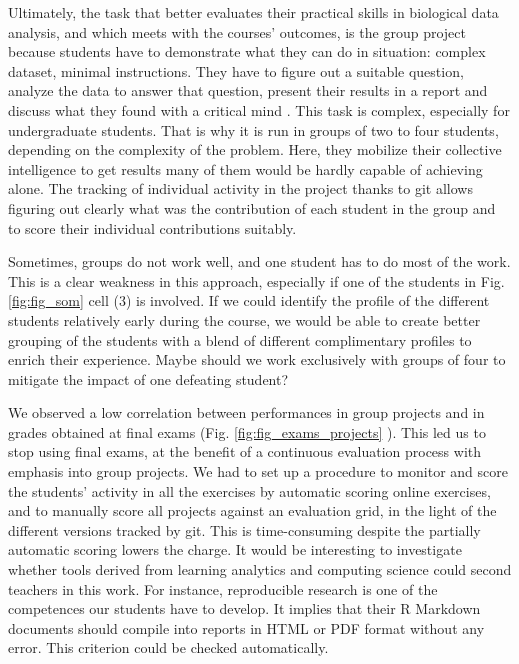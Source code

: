 \documentclass{aims}
\theoremstyle{definition}
\begin{document}
Ultimately, the task that better evaluates their practical skills in
biological data analysis, and which meets with the courses' outcomes, is
the group project because students have to demonstrate what they can do
in situation: complex dataset, minimal instructions. They have to figure
out a suitable question, analyze the data to answer that question,
present their results in a report and discuss what they found with a
critical mind \cite{Auker2020}. This task is complex, especially for
undergraduate students. That is why it is run in groups of two to four
students, depending on the complexity of the problem. Here, they
mobilize their collective intelligence to get results many of them would
be hardly capable of achieving alone. The tracking of individual
activity in the project thanks to git allows figuring out clearly what
was the contribution of each student in the group and to score their
individual contributions suitably.

Sometimes, groups do not work well, and one student has to do most of
the work. This is a clear weakness in this approach, especially if one
of the students in Fig. \ref {fig:fig_som} cell (3) is involved. If we
could identify the profile of the different students relatively early
during the course, we would be able to create better grouping of the
students with a blend of different complimentary profiles to enrich
their experience. Maybe should we work exclusively with groups of four
to mitigate the impact of one defeating student?

We observed a low correlation between performances in group projects and
in grades obtained at final exams (Fig. \ref {fig:fig_exams_projects} ).
This led us to stop using final exams, at the benefit of a continuous
evaluation process with emphasis into group projects. We had to set up a
procedure to monitor and score the students' activity in all the
exercises by automatic scoring online exercises, and to manually score
all projects against an evaluation grid, in the light of the different
versions tracked by git. This is time-consuming despite the partially
automatic scoring lowers the charge. It would be interesting to
investigate whether tools derived from learning analytics and computing
science could second teachers in this work. For instance, reproducible
research is one of the competences our students have to develop. It
implies that their R Markdown documents should compile into reports in
HTML or PDF format without any error. This criterion could be checked
automatically.
\end{document}
